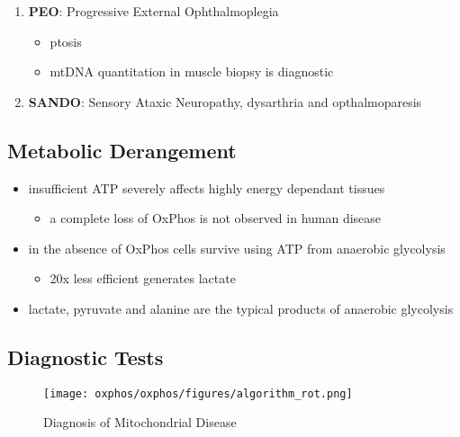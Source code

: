 \documentclass{scrartcl}
\begin{document}
\begin{enumerate}
\begin{enumerate}
\item \textbf{PEO}: Progressive External Ophthalmoplegia
\label{sec:org87bfbc5}
\begin{itemize}
\item ptosis
\item mtDNA quantitation in muscle biopsy is diagnostic
\end{itemize}

\item \textbf{SANDO}: Sensory Ataxic Neuropathy, dysarthria and opthalmoparesis
\label{sec:orgd7cee2b}
\end{enumerate}
\end{enumerate}

\subsection{Metabolic Derangement}
\label{sec:org57f1719}
\begin{itemize}
\item insufficient ATP severely affects highly energy dependant tissues
\begin{itemize}
\item a complete loss of OxPhos is not observed in human disease
\end{itemize}
\item in the absence of OxPhos cells survive using ATP from anaerobic glycolysis
\begin{itemize}
\item 20x less efficient generates lactate
\end{itemize}
\item lactate, pyruvate and alanine are the typical products of anaerobic glycolysis
\end{itemize}

\subsection{Diagnostic Tests}
\label{sec:org101a30e}
\begin{figure}[htbp]
\centering
\texttt{[image: oxphos/oxphos/figures/algorithm\_rot.png]}
\caption{\label{fig:org09bf11f}Diagnosis of Mitochondrial Disease}
\end{figure}
\end{document}
